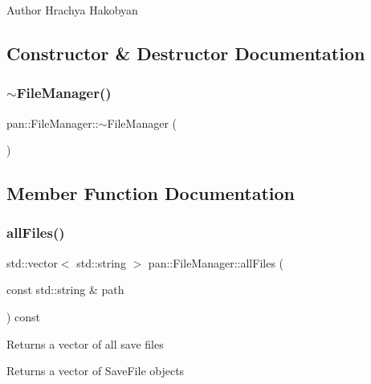 \begin{DoxyAuthor}{Author}
Hrachya Hakobyan 
\end{DoxyAuthor}


\subsection{Constructor \& Destructor Documentation}
\mbox{\label{classpan_1_1_file_manager_a4637c4b4f9d1c264d5373eafe9f8ef60}} 
\subsubsection{\texorpdfstring{$\sim$\+File\+Manager()}{~FileManager()}}
{\footnotesize\ttfamily pan\+::\+File\+Manager\+::$\sim$\+File\+Manager (\begin{DoxyParamCaption}{ }\end{DoxyParamCaption})\hspace{0.3cm}{\ttfamily [default]}}



\subsection{Member Function Documentation}
\mbox{\label{classpan_1_1_file_manager_af9d8a64e6bd6cae23ee56af2f13a8124}} 
\subsubsection{\texorpdfstring{all\+Files()}{allFiles()}}
{\footnotesize\ttfamily std\+::vector$<$ std\+::string $>$ pan\+::\+File\+Manager\+::all\+Files (\begin{DoxyParamCaption}\item[{const std\+::string \&}]{path }\end{DoxyParamCaption}) const}

Returns a vector of all save files \begin{DoxyReturn}{Returns}
a vector of Save\+File objects 
\end{DoxyReturn}
\mbox{\label{classpan_1_1_file_manager_a9c6dc615236819bad04dc9db880db6f6}} 

